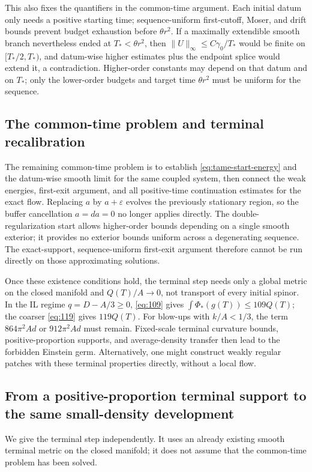 \documentclass[a4paper,11pt]{article}
\numberwithin{equation}{section}
\theoremstyle{definition}
\begin{document}
This also fixes the quantifiers in the common-time argument. Each initial datum only needs a positive starting time;
sequence-uniform first-cutoff, Moser, and drift bounds prevent budget exhaustion before $\theta r^2$.
If a maximally extendible smooth branch nevertheless ended at $T_*<\theta r^2$,
then $\|U\|_\infty\le C\gamma_0/T_*$ would be finite on $[T_*/2,T_*)$,
and datum-wise higher estimates plus the endpoint splice would extend it, a contradiction.
Higher-order constants may depend on that datum and on $T_*$; only the lower-order budgets and target time
$\theta r^2$ must be uniform for the sequence.

\subsection{The common-time problem and terminal recalibration}
The remaining common-time problem is to establish
\eqref{eq:tame-start-energy} and the datum-wise smooth limit for the same coupled system, then connect the weak energies,
first-exit argument, and all positive-time continuation estimates for the exact flow.
Replacing $a$ by $a+\varepsilon$ evolves the previously stationary region, so the buffer cancellation $a=da=0$ no longer applies directly.
The double-regularization start allows higher-order bounds depending on a single smooth exterior; it provides no exterior bounds uniform across a degenerating sequence.
The exact-support, sequence-uniform first-exit argument therefore cannot be run directly on those approximating solutions.

Once these existence conditions hold, the terminal step needs only a global metric on the closed manifold and
$Q(T)/A\to0$, not transport of every initial spinor.
In the IL regime $q=D-A/3\ge0$, \eqref{eq:109} gives
$\int\Phi_*(g(T))\le109Q(T)$; the coarser \eqref{eq:119} gives $119Q(T)$.
For blow-ups with $k/A<1/3$, the term $864\pi^2Ad$ or $912\pi^2Ad$ must remain.
Fixed-scale terminal curvature bounds, positive-proportion supports, and average-density transfer then lead to the forbidden Einstein germ.
Alternatively, one might construct weakly regular patches with these terminal properties directly, without a local flow.

\subsection{From a positive-proportion terminal support to the same small-density development}\label{sec:terminal-liouville}
We give the terminal step independently. It uses an already existing smooth terminal metric on the closed manifold;
it does not assume that the common-time problem has been solved.
\end{document}
